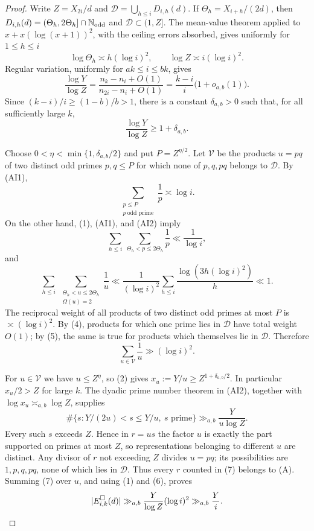 \begin{proof}
Write $Z=X_{2i}/d$ and
$\mathcal D=\bigcup_{h\leq i}D_{i,h}(d)$.  If
$\Theta_h=X_{i+h}/(2d)$, then
$D_{i,h}(d)=(\Theta_h,2\Theta_h]\cap\mathbb N_{\rm odd}$ and
$\mathcal D\subset(1,Z]$.  The mean-value theorem applied to
$x+x(\log(x+1))^2$, with the ceiling errors absorbed, gives uniformly for
$1\leq h\leq i$
\[
  \log\Theta_h\asymp h(\log i)^2,
  \qquad \log Z\asymp i(\log i)^2.
  \tag{1}
\]
Regular variation, uniformly for $ak\leq i\leq bk$, gives
\[
 \frac{\log Y}{\log Z}
 =\frac{n_k-n_i+O(1)}{n_{2i}-n_i+O(1)}
 =\frac{k-i}{i}\bigl(1+o_{a,b}(1)\bigr).
\]
Since $(k-i)/i\geq(1-b)/b>1$, there is a constant
$\delta_{a,b}>0$ such that, for all sufficiently large $k$,
\[
  \frac{\log Y}{\log Z}\geq1+\delta_{a,b}.
  \tag{2}
\]

Choose $0<\eta<\min\{1,\delta_{a,b}/2\}$ and put
$P=Z^{\eta/2}$.  Let $\mathcal V$ be the products $u=pq$ of two distinct
odd primes $p,q\leq P$ for which none of $p,q,pq$ belongs to $\mathcal D$.
By (AI1),
\[
 \sum_{\substack{p\leq P\\p\ \text{odd prime}}}\frac1p\asymp\log i.
 \tag{3}
\]
On the other hand, (1), (AI1), and (AI2) imply
\[
 \sum_{h\leq i}\ \sum_{\Theta_h<p\leq2\Theta_h}\frac1p
 \ll\frac1{\log i},
 \tag{4}
\]
and
\[
 \sum_{h\leq i}\ \sum_{\substack{\Theta_h<u\leq2\Theta_h\\
                                    \Omega(u)=2}}\frac1u
 \ll\frac1{(\log i)^2}
       \sum_{h\leq i}\frac{\log(3h(\log i)^2)}h
 \ll1.
 \tag{5}
\]
The reciprocal weight of all products of two distinct odd primes at most
$P$ is $\asymp(\log i)^2$.  By (4), products for which one prime lies in
$\mathcal D$ have total weight $O(1)$; by (5), the same is true for
products which themselves lie in $\mathcal D$.  Therefore
\[
  \sum_{u\in\mathcal V}\frac1u\gg(\log i)^2.
  \tag{6}
\]

For $u\in\mathcal V$ we have $u\leq Z^\eta$, so (2) gives
$x_u:=Y/u\geq Z^{1+\delta_{a,b}/2}$.  In particular $x_u/2>Z$ for large
$k$.  The dyadic prime number theorem in (AI2), together with
$\log x_u\asymp_{a,b}\log Z$, supplies
\[
 \#\{s:Y/(2u)<s\leq Y/u,\ s\text{ prime}\}
 \gg_{a,b}\frac{Y}{u\log Z}.
 \tag{7}
\]
Every such $s$ exceeds $Z$.  Hence in $r=us$ the factor $u$ is exactly the
part supported on primes at most $Z$, so representations belonging to
different $u$ are distinct.  Any divisor of $r$ not exceeding $Z$ divides
$u=pq$; its possibilities are $1,p,q,pq$, none of which lies in
$\mathcal D$.  Thus every $r$ counted in (7) belongs to (A).  Summing (7)
over $u$, and using (1) and (6), proves
\[
 \lvert E^\square_{i,k}(d)\rvert
 \gg_{a,b}\frac{Y}{\log Z}(\log i)^2
 \gg_{a,b}\frac Yi.
\]
\end{proof}

